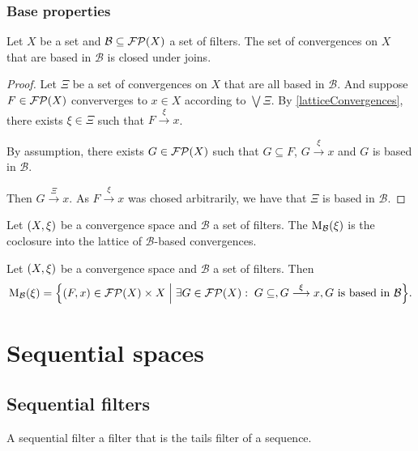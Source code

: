 \subsection{Base properties}
\begin{lemma}
Let $X$ be a set and $\mathcal{B}\subseteq \operatorname{\mathcal{FP}}(X)$ a set of filters. The set of convergences on $X$ that are based in $\mathcal{B}$ is closed under joins.
\end{lemma}
\begin{proof}
Let $\Xi$ be a set of convergences on $X$ that are all based in $\mathcal{B}$. And suppose $F\in\operatorname{\mathcal{FP}}(X)$ conververges to $x\in X$ according to $\bigvee \Xi$. By \ref{latticeConvergences}, there exists $\xi\in \Xi$ such that $F\overset{\xi}{\longrightarrow} x$.

By assumption, there exists $G\in\operatorname{\mathcal{FP}}(X)$ such that $G\subseteq F$, $G\overset{\xi}{\longrightarrow} x$ and $G$ is based in $\mathcal{B}$.

Then $G\overset{\Xi}{\longrightarrow} x$. As $F\overset{\xi}{\longrightarrow} x$ was chosed arbitrarily, we have that $\Xi$ is based in $\mathcal{B}$.
\end{proof}

\begin{definition}
Let $\left( X, \xi \right)$ be a convergence space and $\mathcal{B}$ a set of filters. The  $\operatorname{M}_\mathcal{B}(\xi)$ is the coclosure into the lattice of $\mathcal{B}$-based convergences.
\end{definition}

\begin{lemma}
Let $\left( X, \xi \right)$ be a convergence space and $\mathcal{B}$ a set of filters. Then
\[ \basedMod_\mathcal{B}(\xi) = \setbuilder{(F,x)\in \powerfilters(X)\times X}{\exists G\in \powerfilters(X): \; G\subseteq, G\overset{\xi}{\longrightarrow} x, \text{$G$ is based in $\mathcal{B}$}}. \]
\end{lemma}




\chapter{Sequential spaces}

\section{Sequential filters}
A sequential filter a filter that is the tails filter of a sequence.

